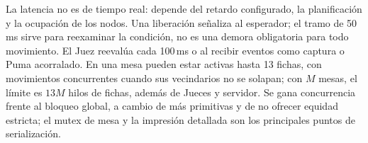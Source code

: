 \documentclass[10pt]{article}
\begin{document}
La latencia no es de tiempo real: depende del retardo configurado, la
planificación y la ocupación de los nodos. Una liberación señaliza al
esperador; el tramo de 50\,ms sirve para reexaminar la condición, no es una
demora obligatoria para todo movimiento. El Juez reevalúa cada 100\,ms o al
recibir eventos como captura o Puma acorralado. En una mesa pueden estar
activas hasta 13 fichas, con movimientos concurrentes cuando sus vecindarios
no se solapan; con $M$ mesas, el límite es $13M$ hilos de fichas, además de
Jueces y servidor. Se gana concurrencia frente al bloqueo global, a cambio
de más primitivas y de no ofrecer equidad estricta; el mutex de mesa y la
impresión detallada son los principales puntos de serialización.
\end{document}
